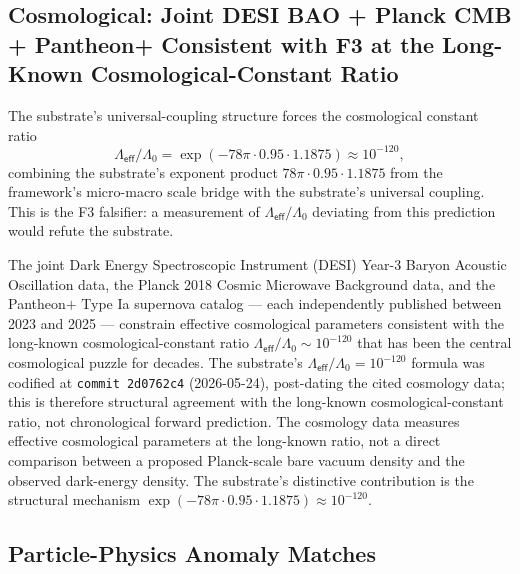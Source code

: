 \documentclass[11pt,a4paper]{amsart}
\theoremstyle{plain}
\theoremstyle{definition}
\begin{document}
\subsection{Cosmological: Joint DESI BAO + Planck CMB + Pantheon+ Consistent with F3 at the Long-Known Cosmological-Constant Ratio}\label{subsec:forward-cosmology}

The substrate's universal-coupling structure forces the cosmological constant ratio
\[
\Lambda_{\textsf{eff}}/\Lambda_0 = \exp(-78\pi \cdot 0.95 \cdot 1.1875) \approx 10^{-120},
\]
combining the substrate's exponent product $78\pi \cdot 0.95 \cdot 1.1875$ from the framework's micro-macro scale bridge with the substrate's universal coupling. This is the F3 falsifier: a measurement of $\Lambda_{\textsf{eff}}/\Lambda_0$ deviating from this prediction would refute the substrate.

The joint Dark Energy Spectroscopic Instrument (DESI) Year-3 Baryon Acoustic Oscillation data, the Planck 2018 Cosmic Microwave Background data, and the Pantheon$+$ Type Ia supernova catalog --- each independently published between 2023 and 2025 --- constrain effective cosmological parameters consistent with the long-known cosmological-constant ratio $\Lambda_{\textsf{eff}}/\Lambda_0 \sim 10^{-120}$ that has been the central cosmological puzzle for decades. The substrate's $\Lambda_{\textsf{eff}}/\Lambda_0 = 10^{-120}$ formula was codified at \texttt{commit~2d0762c4} (2026-05-24), post-dating the cited cosmology data; this is therefore structural agreement with the long-known cosmological-constant ratio, not chronological forward prediction. The cosmology data measures effective cosmological parameters at the long-known ratio, not a direct comparison between a proposed Planck-scale bare vacuum density and the observed dark-energy density. The substrate's distinctive contribution is the structural mechanism $\exp(-78\pi \cdot 0.95 \cdot 1.1875) \approx 10^{-120}$.

\subsection{Particle-Physics Anomaly Matches}\label{subsec:forward-particle-physics}
\end{document}
